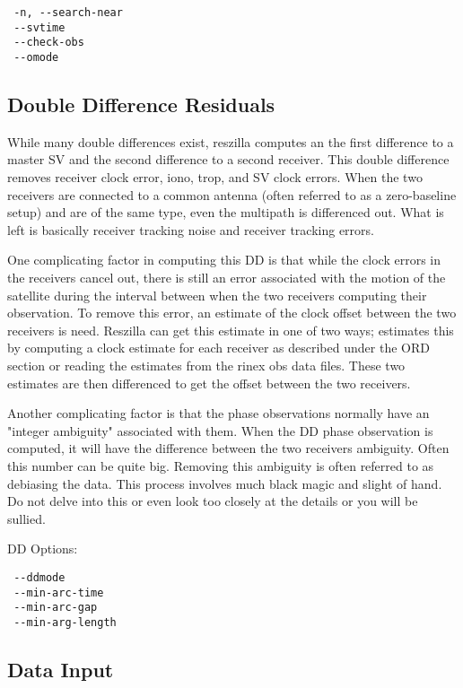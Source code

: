 \begin{verbatim}
 -n, --search-near
 --svtime
 --check-obs
 --omode
\end{verbatim}

\subsection{Double Difference Residuals}
While many double differences exist, reszilla computes an the first
difference to a master SV and the second difference to a second
receiver.  This double difference removes receiver clock error, iono,
trop, and SV clock errors. When the two receivers are connected to a
common antenna (often referred to as a zero-baseline setup) and are of
the same type, even the multipath is differenced out. What is left is
basically receiver tracking noise and receiver tracking errors.

One complicating factor in computing this DD is that while the clock
errors in the receivers cancel out, there is still an error associated
with the motion of the satellite during the interval between when the
two receivers computing their observation. To remove this error, an
estimate of the clock offset between the two receivers is
need. Reszilla can get this estimate in one of two ways; estimates
this by computing a clock estimate for each receiver as described
under the ORD section or reading the estimates from the rinex obs data
files. These two estimates are then differenced to get the offset
between the two receivers.

Another complicating factor is that the phase observations normally
have an "integer ambiguity" associated with them. When the DD phase
observation is computed, it will have the difference between the two
receivers ambiguity. Often this number can be quite big. Removing this
ambiguity is often referred to as debiasing the data. This process
involves much black magic and slight of hand. Do not delve into this
or even look too closely at the details or you will be sullied.

DD Options:

\begin{verbatim}
 --ddmode
 --min-arc-time
 --min-arc-gap
 --min-arg-length
\end{verbatim}

\subsection{Data Input}

